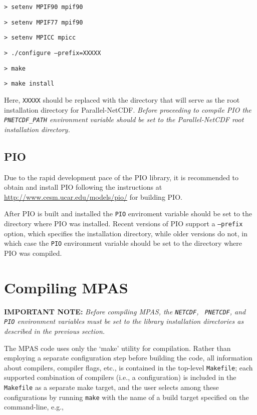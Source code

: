 \vspace{12pt}
{\tt > setenv MPIF90 mpif90}

{\tt > setenv MPIF77 mpif90} 

{\tt > setenv MPICC mpicc}  

{\tt > ./configure --prefix=XXXXX} 

{\tt > make}

{\tt > make install}
\vspace{12pt}

Here, {\tt XXXXX} should be replaced with the directory that will serve as the
root installation directory for Parallel-NetCDF.  {\em Before proceeding to
compile PIO the {\tt PNETCDF\_PATH} environment variable should be set to the
Parallel-NetCDF root installation directory.}


\subsection{PIO}
\label{pio_build}

Due to the rapid development pace of the PIO library, it is recommended to
obtain and install PIO following the instructions at
\url{http://www.cesm.ucar.edu/models/pio/} for building PIO.

After PIO is built and installed the {\tt PIO} enviroment variable should be set to 
the directory where PIO was installed. Recent versions of PIO support a {\tt --prefix}
option, which specifies the installation directory, while older versions do not,
in which case the {\tt PIO} environment variable should be set to the directory where
PIO was compiled.

\section{Compiling MPAS}
\label{compiling_MPAS}

{\bf IMPORTANT NOTE:} {\em Before compiling MPAS, the {\tt NETCDF}, {\tt
PNETCDF}, and {\tt PIO} environment variables must be set to the library
installation directories as described in the previous section.} \vspace{12pt}

The MPAS code uses only the `make' utility for compilation. Rather than
employing a separate configuration step before building the code, all
information about compilers, compiler flags, etc., is contained in the top-level
{\tt Makefile}; each supported combination of compilers (i.e., a configuration)
is included in the {\tt Makefile} as a separate make target, and the user
selects among these configurations by running {\tt make} with the name of a
build target specified on the command-line, e.g.,

